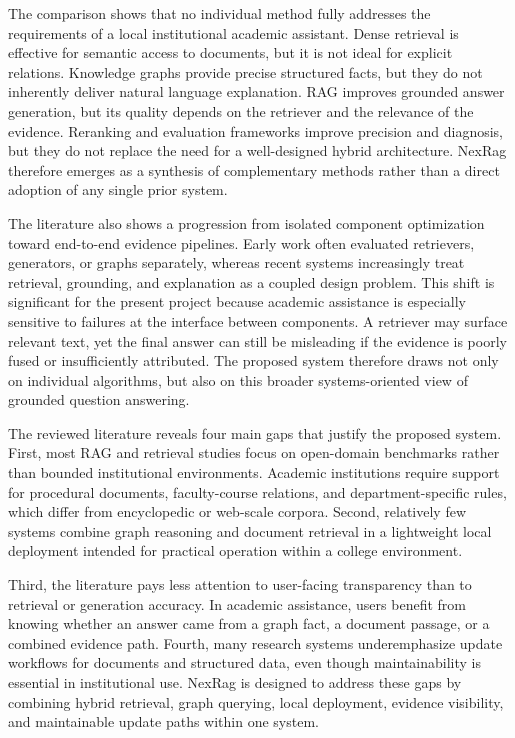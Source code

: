 The comparison shows that no individual method fully addresses the requirements of a local institutional academic assistant. Dense retrieval is effective for semantic access to documents, but it is not ideal for explicit relations. Knowledge graphs provide precise structured facts, but they do not inherently deliver natural language explanation. RAG improves grounded answer generation, but its quality depends on the retriever and the relevance of the evidence. Reranking and evaluation frameworks improve precision and diagnosis, but they do not replace the need for a well-designed hybrid architecture. NexRag therefore emerges as a synthesis of complementary methods rather than a direct adoption of any single prior system.

The literature also shows a progression from isolated component optimization toward end-to-end evidence pipelines. Early work often evaluated retrievers, generators, or graphs separately, whereas recent systems increasingly treat retrieval, grounding, and explanation as a coupled design problem. This shift is significant for the present project because academic assistance is especially sensitive to failures at the interface between components. A retriever may surface relevant text, yet the final answer can still be misleading if the evidence is poorly fused or insufficiently attributed. The proposed system therefore draws not only on individual algorithms, but also on this broader systems-oriented view of grounded question answering.

\label{sec:literature-research-gaps}

The reviewed literature reveals four main gaps that justify the proposed system. First, most RAG and retrieval studies focus on open-domain benchmarks rather than bounded institutional environments. Academic institutions require support for procedural documents, faculty-course relations, and department-specific rules, which differ from encyclopedic or web-scale corpora. Second, relatively few systems combine graph reasoning and document retrieval in a lightweight local deployment intended for practical operation within a college environment.

Third, the literature pays less attention to user-facing transparency than to retrieval or generation accuracy. In academic assistance, users benefit from knowing whether an answer came from a graph fact, a document passage, or a combined evidence path. Fourth, many research systems underemphasize update workflows for documents and structured data, even though maintainability is essential in institutional use. NexRag is designed to address these gaps by combining hybrid retrieval, graph querying, local deployment, evidence visibility, and maintainable update paths within one system.

